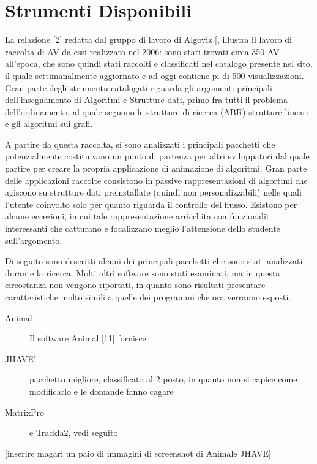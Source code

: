 \section{\label{sec:Strumenti-Disponibili}Strumenti Disponibili}

La relazione {[}2{]} redatta dal gruppo di lavoro di Algoviz {[}\textonesuperior{}{]},
illustra il lavoro di raccolta di AV da essi realizzato nel 2006:
sono stati trovati circa 350 AV all'epoca, che sono quindi stati raccolti
e classificati nel catalogo presente nel sito, il quale settimanalmente
aggiornato e ad oggi contiene pi di 500 visualizzazioni. Gran parte
degli strumentu catalogati riguarda gli argomenti principali dell'insegnamento
di Algoritmi e Strutture dati, primo fra tutti il problema dell'ordinamento,
al quale seguono le strutture di ricerca (ABR) strutture lineari e
gli algoritmi sui grafi.

A partire da questa raccolta, si sono analizzati i principali pacchetti
che potenzialmente costituivano un punto di partenza per altri sviluppatori
dal quale partire per creare la propria applicazione di animazione
di algoritmi. Gran parte delle applicazioni raccolte consistono in
passive rappresentazioni di algortimi che agiscono su strutture dati
preinstallate (quindi non personalizzabili) nelle quali l'utente coinvolto
solo per quanto riguarda il controllo del flusso. Esistono per alcune
eccezioni, in cui tale rappresentazione arricchita con funzionalit
interessanti che catturano e focalizzano meglio l'attenzione dello
studente sull'argomento.

Di seguito sono descritti alcuni dei principali pacchetti che sono
stati analizzati durante la ricerca. Molti altri software sono stati
esaminati, ma in questa circostanza non vengono riportati, in quanto
sono risultati presentare caratteristiche molto simili a quelle dei
programmi che ora verranno esposti. 
\begin{description}
\item [{{Animal}}] Il software Animal {[}11{]} fornisce 
\item [{{JHAVE'}}] pacchetto migliore, classificato al 2 posto, in quanto
non si capice come modificarlo e le domande fanno cagare 
\item [{{MatrixPro}}] e Trackla2, vedi seguito 
\end{description}
{[}inserire magari un paio di immagini di screenshot di Animale JHAVE{]}

